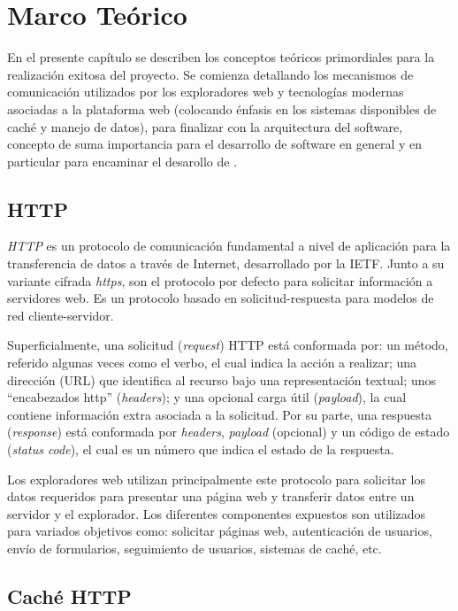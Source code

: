 \chapter{Marco Teórico}

En el presente capítulo se describen los conceptos teóricos primordiales para la realización exitosa del proyecto. Se comienza detallando los mecanismos de comunicación utilizados por los exploradores web y tecnologías modernas asociadas a la plataforma web (colocando énfasis en los sistemas disponibles de caché y manejo de datos), para finalizar con la arquitectura del software, concepto de suma importancia para el desarrollo de software en general y en particular para encaminar el desarollo de \pwas.

\section{HTTP}

\textit{HTTP} es un protocolo de comunicación fundamental a nivel de aplicación para la transferencia de datos a través de Internet, desarrollado por la IETF. Junto a su variante cifrada \textit{https}, son el protocolo por defecto para solicitar información a servidores web. Es un protocolo basado en solicitud-respuesta para modelos de red cliente-servidor.

Superficialmente, una solicitud (\textit{request}) HTTP está conformada por: un método, referido algunas veces como el verbo, el cual indica la acción a realizar; una dirección (URL) que identifica al recurso bajo una representación textual; unos ``encabezados http'' (\textit{headers}); y una opcional carga útil (\textit{payload}), la cual contiene información extra asociada a la solicitud. Por su parte, una respuesta (\textit{response}) está conformada por \textit{headers}, \textit{payload} (opcional) y un código de estado (\textit{status code}), el cual es un número que indica el estado de la respuesta.

Los exploradores web utilizan principalmente este protocolo para solicitar los datos requeridos para presentar una página web y transferir datos entre un servidor y el explorador. Los diferentes componentes expuestos son utilizados para variados objetivos como: solicitar páginas web, autenticación de usuarios, envío de formularios, seguimiento de usuarios, sistemas de caché, etc.

\section{Caché HTTP}

